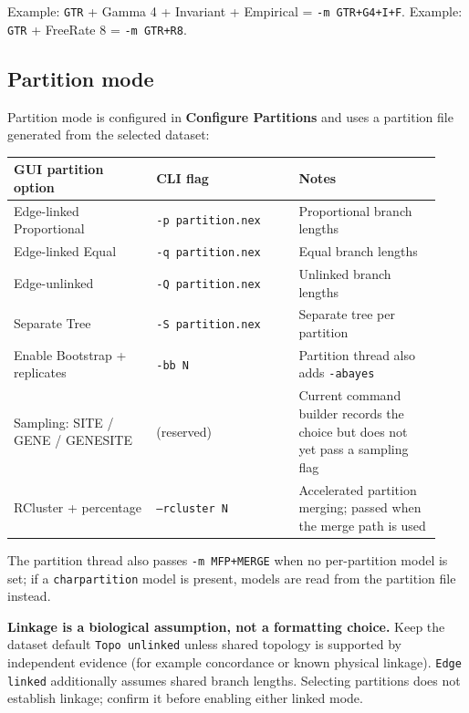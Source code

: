 \documentclass[11pt]{report}
\begin{document}
Example: \texttt{GTR} + Gamma 4 + Invariant + Empirical = \texttt{-m GTR+G4+I+F}. Example: \texttt{GTR} + FreeRate 8 = \texttt{-m GTR+R8}.

\subsection{Partition mode}

Partition mode is configured in \textbf{Configure Partitions} and uses a partition file generated from the selected dataset:

{\footnotesize
\begin{longtable}{@{}>{\raggedright\arraybackslash}p{0.31\linewidth}>{\raggedright\arraybackslash}p{0.31\linewidth}>{\raggedright\arraybackslash}p{0.31\linewidth}@{}}
\toprule
GUI partition option & CLI flag & Notes \\
\midrule
\endhead
Edge-linked Proportional & \texttt{-p partition.\allowbreak nex} & Proportional branch lengths \\
Edge-linked Equal & \texttt{-q partition.\allowbreak nex} & Equal branch lengths \\
Edge-unlinked & \texttt{-Q partition.\allowbreak nex} & Unlinked branch lengths \\
Separate Tree & \texttt{-S partition.\allowbreak nex} & Separate tree per partition \\
Enable Bootstrap + replicates & \texttt{-bb N} & Partition thread also adds \texttt{-abayes} \\
Sampling: SITE / GENE / GENESITE & (reserved) & Current command builder records the choice but does not yet pass a sampling flag \\
RCluster + percentage & \texttt{--rcluster N} & Accelerated partition merging; passed when the merge path is used \\
\bottomrule
\end{longtable}
}

The partition thread also passes \texttt{-m MFP+MERGE} when no per-partition model is set; if a \texttt{charpartition} model is present, models are read from the partition file instead.

\textbf{Linkage is a biological assumption, not a formatting choice.} Keep the dataset default \texttt{Topo unlinked} unless shared topology is supported by independent evidence (for example concordance or known physical linkage). \texttt{Edge linked} additionally assumes shared branch lengths. Selecting partitions does not establish linkage; confirm it before enabling either linked mode.
\end{document}
